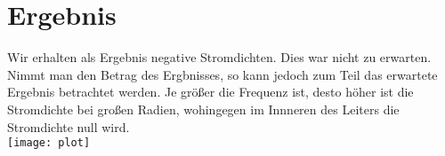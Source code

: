 \documentclass[ngerman]{scrartcl}
\begin{document}
\section*{Ergebnis}

Wir erhalten als Ergebnis negative Stromdichten. Dies war nicht zu erwarten.
Nimmt man den Betrag des Ergbnisses, so kann jedoch zum Teil das erwartete Ergebnis betrachtet werden.
Je größer die Frequenz ist, desto höher ist die Stromdichte bei großen Radien, wohingegen im Innneren des
Leiters die Stromdichte null wird.\\
\texttt{[image: plot]}
\end{document}
